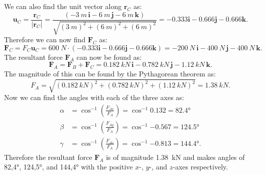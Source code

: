 \documentclass[a4paper]{article}
\begin{document}
We can also find the unit vector along $\textbf{r}_C$ as:
\[ 
\textbf{u}_C = \frac{\textbf{r}_C}{\left| \textbf{r}_C \right|} = \frac{\left( - \qty{3}{m} \, \textbf{i} - \qty{6}{m} \, \textbf{j} - \qty{6}{m}\, \textbf{k} \right)}{\sqrt{\left( \qty{3}{m}  \right)^2 + \left( \qty{6}{m}  \right)^2 + \left( \qty{6}{m}  \right)^2}} = - \num{0,333} \textbf{i} - \num{0,666} \textbf{j} - \num{0,666} \textbf{k}
.\]
Therefore we can now find $\textbf{F}_C$ as:
\[ 
\textbf{F}_C = F_C \textbf{u}_C = \qty{600}{N} \cdot \left( -\num{0,333} \textbf{i} - \num{0,666} \textbf{j} - \num{0,666}  \textbf{k} \right) = - \qty{200}{N} \, \textbf{i} - \qty{400}{N} \, \textbf{j} - \qty{400}{N} \, \textbf{k}
.\]
The resultant force $\textbf{F}_A$ can now be found as:
\[ 
  \textbf{F}_A = \textbf{F}_B + \textbf{F}_C = \qty{0,182}{kN} \, \textbf{i} - \qty{0,782}{kN} \, \textbf{j} - \qty{1,12}{kN} \, \textbf{k}
.\]
The magnitude of this can be found by the Pythagorean theorem as:
\[ 
F_A = \sqrt{\left( \qty{0,182}{kN}  \right)^2 + \left( \qty{0,782}{kN}  \right)^2 +( \qty{1,12}{kN} )^2} = \qty{1,38}{kN} 
.\]
Now we can find the angles with each of the three axes as:
\begin{align*}
  \alpha &= \cos^{-1} \left( \frac{F_{Ax}}{F_A} \right) = \cos^{-1} \num{0,132} = \ang{82,4} \\
  \beta &= \cos^{-1} \left( \frac{F_{Ay}}{F_A} \right) = \cos^{-1} \num{-0,567} = \ang{124,5}  \\
  \gamma &= \cos^{-1} \left( \frac{F_{Az}}{F_A} \right) = \cos^{-1} \num{-0,813} = \ang{144,4} 
.\end{align*}
Therefore the resultant force $\textbf{F}_A$ is of magnitude \qty{1,38}{kN} and makes angles of \ang{82,4}, \ang{124,5}, and \ang{144,4} with the positive $x$-, $y$-, and $z$-axes respectively. 
\end{document}
